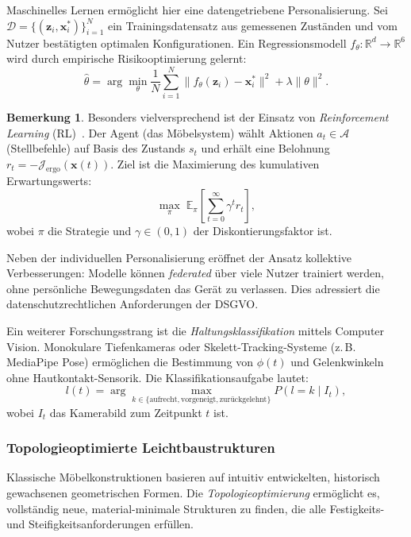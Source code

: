 \documentclass[a4paper,12pt]{article}
\theoremstyle{definition}
\newtheorem{bemerkung}{Bemerkung}
\begin{document}
Maschinelles Lernen erm\"{o}glicht hier eine datengetriebene Personalisierung.
Sei $\mathcal{D} = \{(\mathbf{z}_i, \mathbf{x}_i^*)\}_{i=1}^N$ ein
Trainingsdatensatz aus gemessenen Zust\"{a}nden und vom Nutzer best\"{a}tigten optimalen
Konfigurationen. Ein Regressionsmodell $f_\theta\colon \mathbb{R}^d \to \mathbb{R}^6$
wird durch empirische Risikooptimierung gelernt:
\[
	\hat\theta = \arg\min_\theta \frac{1}{N}\sum_{i=1}^N
	\bigl\| f_\theta(\mathbf{z}_i) - \mathbf{x}_i^*\bigr\|^2 + \lambda\|\theta\|^2.
\]

\begin{bemerkung}
	Besonders vielversprechend ist der Einsatz von \emph{Reinforcement Learning} (RL)~\cite{SuttonBarto2018}.
	Der Agent (das M\"{o}belsystem) w\"{a}hlt Aktionen $a_t \in \mathcal{A}$ (Stellbefehle)
	auf Basis des Zustands $s_t$ und erh\"{a}lt eine Belohnung
	$r_t = -\mathcal{J}_{\mathrm{ergo}}(\mathbf{x}(t))$.
	Ziel ist die Maximierung des kumulativen Erwartungswerts:
	\[
		\max_\pi \;\mathbb{E}_\pi\!\left[\sum_{t=0}^\infty \gamma^t r_t\right],
	\]
	wobei $\pi$ die Strategie und $\gamma \in (0, 1)$ der Diskontierungsfaktor ist.
\end{bemerkung}

Neben der individuellen Personalisierung er\"{o}ffnet der Ansatz kollektive
Verbesserungen: Modelle k\"{o}nnen \emph{federated} \"{u}ber viele Nutzer trainiert werden,
ohne pers\"{o}nliche Bewegungsdaten das Ger\"{a}t zu verlassen. Dies adressiert die
datenschutzrechtlichen Anforderungen der DSGVO.

Ein weiterer Forschungsstrang ist die \emph{Haltungsklassifikation} mittels
Computer Vision. Monokulare Tiefenkameras oder Skelett-Tracking-Systeme
(z.\,B. MediaPipe Pose) erm\"{o}glichen die Bestimmung von $\phi(t)$ und
Gelenkwinkeln ohne Hautkontakt-Sensorik. Die Klassifikationsaufgabe lautet:
\[
	l(t) = \arg\max_{k \in \{\text{aufrecht}, \text{vorgeneigt}, \text{zur\"{u}ckgelehnt}\}}
	P(l = k \mid I_t),
\]
wobei $I_t$ das Kamerabild zum Zeitpunkt $t$ ist.

\subsubsection{Topologieoptimierte Leichtbaustrukturen}

Klassische M\"{o}belkonstruktionen basieren auf intuitiv entwickelten, historisch
gewachsenen geometrischen Formen. Die \emph{Topologieoptimierung} erm\"{o}glicht es,
vollst\"{a}ndig neue, material-minimale Strukturen zu finden, die alle
Festigkeits- und Steifigkeitsanforderungen erf\"{u}llen.
\end{document}
